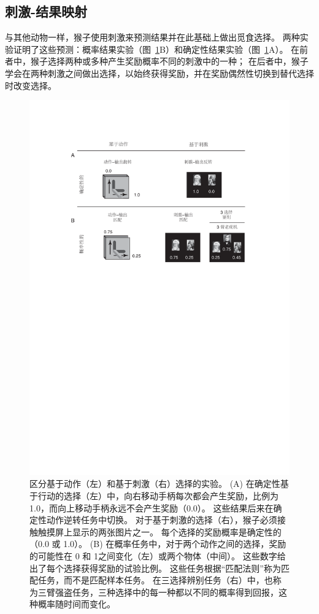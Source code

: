 \subsection{刺激-结果映射}

与其他动物一样，猴子使用刺激来预测结果并在此基础上做出觅食选择。
两种实验证明了这些预测：概率结果实验（图~\ref{fig:fig_4_5}B）和确定性结果实验（图~\ref{fig:fig_4_5}A）。
在前者中，猴子选择两种或多种产生奖励概率不同的刺激中的一种；
在后者中，猴子学会在两种刺激之间做出选择，以始终获得奖励，并在奖励偶然性切换到替代选择时改变选择。\par


\begin{figure}[!htb]
	\centering
	\includegraphics{chap4/fig_4_5}
	\caption{区分基于动作（左）和基于刺激（右）选择的实验。
		(A) 在确定性基于行动的选择（左）中，向右移动手柄每次都会产生奖励，比例为 1.0，而向上移动手柄永远不会产生奖励（0.0）。
		这些结果后来在确定性动作逆转任务中切换。
		对于基于刺激的选择（右），猴子必须接触触摸屏上显示的两张图片之一。
		每个选择的奖励概率是确定性的（0.0 或 1.0）。 
		(B) 在概率任务中，对于两个动作之间的选择，奖励的可能性在 0 和 1之间变化（左）或两个物体（中间）。
		这些数字给出了每个选择获得奖励的试验比例。
		这些任务根据“匹配法则”称为匹配任务，而不是匹配样本任务。
		在三选择辨别任务（右）中，也称为三臂强盗任务，三种选择中的每一种都以不同的概率得到回报，这种概率随时间而变化\cite{rudebeck2008frontal}。}
	\label{fig:fig_4_5}
\end{figure}


